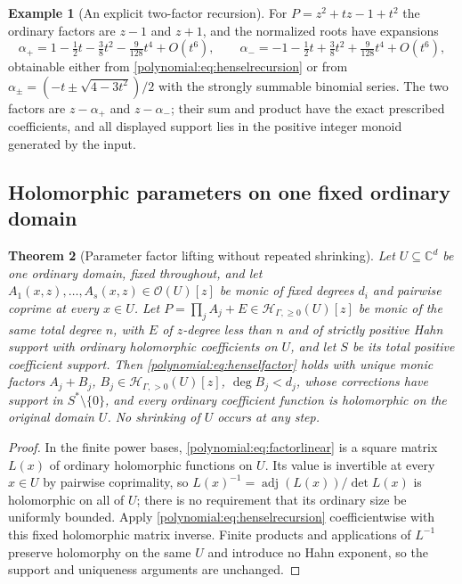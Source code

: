\documentclass[11pt,letterpaper]{article}
\numberwithin{equation}{section}
\newtheorem{theorem}{Theorem}[section]
\theoremstyle{definition}
\newtheorem{example}[theorem]{Example}
\theoremstyle{remark}\newtheorem{remark}[theorem]{Remark}
\newcommand{\C}{\mathbb C}
\newcommand{\OO}{\mathcal O}
\newcommand{\HHp}{\mathscr H_{\Gamma,>0}}
\newcommand{\HHn}{\mathscr H_{\Gamma,\ge0}}
\newcommand{\adj}{\operatorname{adj}}
\begin{document}
\begin{example}[An explicit two-factor recursion]\label{polynomial:ex:hensel}
For $P=z^2+tz-1+t^2$ the ordinary factors are $z-1$ and $z+1$, and the
normalized roots have expansions
\[
 \alpha_+=1-\tfrac12t-\tfrac38t^2-\tfrac9{128}t^4+O(t^6),\qquad
 \alpha_-=-1-\tfrac12t+\tfrac38t^2+\tfrac9{128}t^4+O(t^6),
\]
obtainable either from \eqref{polynomial:eq:henselrecursion} or from
$\alpha_\pm=(-t\pm\sqrt{4-3t^2})/2$ with the strongly summable binomial
series. The two factors are $z-\alpha_+$ and $z-\alpha_-$; their sum and
product have the exact prescribed coefficients, and all displayed support lies
in the positive integer monoid generated by the input.
\end{example}

\subsection{Holomorphic parameters on one fixed ordinary domain}
\begin{theorem}[Parameter factor lifting without repeated shrinking]
\label{polynomial:thm:parameterhensel}
Let $U\subseteq\C^d$ be one ordinary domain, fixed throughout, and let
$A_1(x,z),\ldots,A_s(x,z)\in\OO(U)[z]$ be monic of fixed degrees $d_i$ and
pairwise coprime at \emph{every} $x\in U$. Let
$P=\prod_jA_j+E\in\HHn(U)[z]$ be monic of the same total degree $n$, with $E$
of $z$-degree less than $n$ and of strictly positive Hahn support with
ordinary holomorphic coefficients on $U$, and let $S$ be its total positive
coefficient support. Then \eqref{polynomial:eq:henselfactor} holds with unique
monic factors $A_j+B_j$, $B_j\in\HHp(U)[z]$, $\deg B_j<d_j$, whose corrections
have support in $S^*\setminus\{0\}$, and every ordinary coefficient function
is holomorphic on the \emph{original} domain $U$. No shrinking of $U$ occurs
at any step.
\end{theorem}
\begin{proof}
In the finite power bases, \eqref{polynomial:eq:factorlinear} is a square
matrix $L(x)$ of ordinary holomorphic functions on $U$. Its value is
invertible at every $x\in U$ by pairwise coprimality, so
$L(x)^{-1}=\adj(L(x))/\det L(x)$ is holomorphic on all of $U$; there is no
requirement that its ordinary size be uniformly bounded. Apply
\eqref{polynomial:eq:henselrecursion} coefficientwise with this fixed
holomorphic matrix inverse. Finite products and applications of $L^{-1}$
preserve holomorphy on the same $U$ and introduce no Hahn exponent, so the
support and uniqueness arguments are unchanged.
\end{proof}
\end{document}
